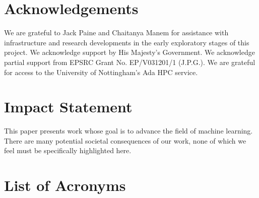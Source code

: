 \documentclass{article}
\begin{document}
\newpage
\section*{Acknowledgements}
We are grateful to Jack Paine and Chaitanya Manem for assistance with infrastructure and research developments in the early exploratory stages of this project. 
We acknowledge support by His Majesty’s Government. 
We acknowledge partial support from EPSRC Grant No. EP/V031201/1 (J.P.G.). 
We are grateful for access to the University of Nottingham’s Ada HPC service.
\section*{Impact Statement}
This paper presents work whose goal is to advance the field of machine learning. There are many potential societal consequences of our work, none of which we feel must be specifically highlighted here.




\newpage
\appendix
\onecolumn

\section{List of Acronyms}
\end{document}
